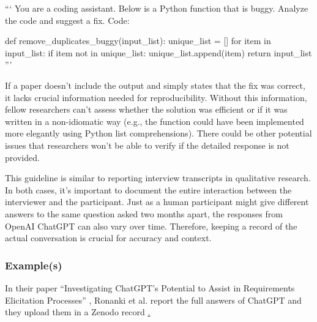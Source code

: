 ```
You are a coding assistant. Below is a Python function that is buggy. Analyze the code and suggest a fix.
Code:

def remove_duplicates_buggy(input_list):
    unique_list = []
    for item in input_list:
        if item not in unique_list:
            unique_list.append(item)
    return input_list 
'''

If a paper doesn't include the output and simply states that the fix was correct, it lacks crucial information needed for reproducibility. Without this information, fellow researchers can't assess whether the solution was efficient or if it was written in a non-idiomatic way (e.g., the function could have been implemented more elegantly using Python list comprehensions). There could be other potential issues that researchers won't be able to verify if the detailed response is not provided.

This guideline is similar to reporting interview transcripts in qualitative research. In both cases, it's important to document the entire interaction between the interviewer and the participant. Just as a human participant might give different answers to the same question asked two months apart, the responses from OpenAI ChatGPT can also vary over time. Therefore, keeping a record of the actual conversation is crucial for accuracy and context.



\subsubsection{Example(s)}

In their paper ``Investigating ChatGPT's Potential to Assist in Requirements Elicitation Processes'' \cite{ronanki2023investigating}, Ronanki et al. report the full answers of ChatGPT and they upload them in a Zenodo record \href{https://zenodo.org/records/8124936}. 



